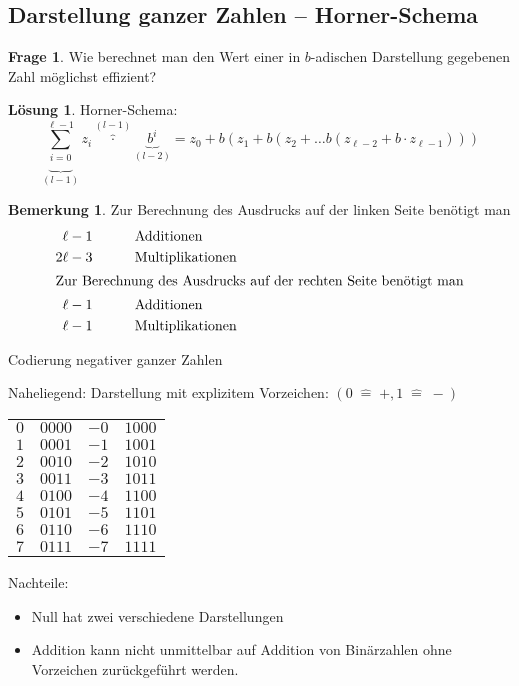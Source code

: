 \documentclass[a4paper,12pt]{article}
\theoremstyle{definition}
\newtheorem*{bemerkung}{Bemerkung}
\newtheorem*{frage}{Frage}
\newtheorem*{loesung}{Lösung}
\newcommand{\corresponds}{\;\widehat{=}\;}
\begin{document}
	\setcounter{section}{2}
	\setcounter{subsection}{2}
	\subsection{Darstellung ganzer Zahlen -- Horner-Schema}
	\begin{frage}
		Wie berechnet man den Wert einer in $b$-adischen Darstellung gegebenen Zahl möglichst effizient?
	\end{frage}
	\begin{loesung}
		Horner-Schema:
		\[
			\underbrace{\sum_{i = 0}}_{(l-1)}^{\ell - 1}z_i \overbrace{\cdot}^{(l-1)} \underbrace{b^i}_{(l-2)} = z_0 + b(z_1 + b(z_2 + \ldots b (z_{\ell - 2} + b\cdot z_{\ell - 1})))
		\]
	\end{loesung}
	\begin{bemerkung}
		Zur Berechnung des Ausdrucks auf der linken Seite benötigt man
		\begin{align*}
			\ell - 1\hspace*{7ex}&\text{Additionen}\\
			2\ell - 3\hspace*{7ex}&\text{Multiplikationen}\\
			\intertext{Zur Berechnung des Ausdrucks auf der rechten Seite benötigt man}
			\ell - 1\hspace*{7ex}& \text{Additionen}\\
			\ell - 1\hspace*{7ex}& \text{Multiplikationen}
		\end{align*}
	\end{bemerkung}
	Codierung negativer ganzer Zahlen
	
	Naheliegend: Darstellung mit explizitem Vorzeichen: $(0 \corresponds  +, 1 \corresponds -)$
	\begin{center}
		\begin{tabular}{l l l l}
			$0$\hspace*{2ex} &$0000$\hspace*{5ex} &$-0$\hspace*{2ex} &$1000$\\
			$1$ &$0001$ & $-1$ & $1001$\\
			$2$ &$0010$ & $-2$ & $1010$\\
			$3$ &$0011$ & $-3$ & $1011$\\
			$4$ &$0100$ & $-4$ & $1100$\\
			$5$ &$0101$ & $-5$ & $1101$\\
			$6$ &$0110$ & $-6$ & $1110$\\
			$7$ &$0111$ & $-7$ & $1111$
		\end{tabular}
	\end{center}
	Nachteile: \begin{itemize}
		\item Null hat zwei verschiedene Darstellungen
		\item Addition kann nicht unmittelbar auf Addition von Binärzahlen ohne Vorzeichen zurückgeführt werden.
	\end{itemize}
	
\end{document}
